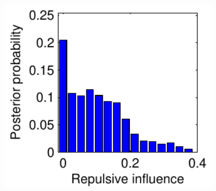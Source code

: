 \documentclass{statsoc}
\begin{document}
\begin{figure}
\begin{minipage}[h]{0.3\linewidth}
  \includegraphics[width=0.98\textwidth]{figs/plot_mod_repuls.pdf}
  \end{minipage}
  \end{figure}
\end{document}
